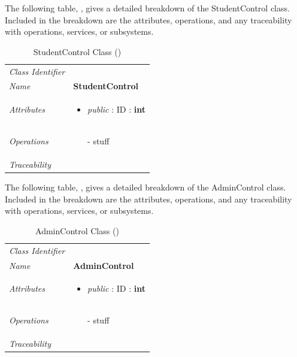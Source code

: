 \documentclass[12pt,letterpaper]{article}
\begin{document}
The following table, , gives a detailed breakdown of the StudentControl class. Included in the breakdown are the attributes, operations, and any traceability with operations, services, or subsystems.

\begin{table}[H]
    \caption{StudentControl Class ()} 
	\begin{tabu} to 
		\toprule
		Class Identifier &  \\
		Name & {\bf StudentControl} \\
		Attributes & 
		\begin{minipage}[t]{\linewidth}
		    \begin{itemize}
		        \item \textit{public} : ID : \bf{int}
			\end{itemize}
	    \end{minipage} \\

		Operations &
		\begin{minipage}[t]{\linewidth}
			\begin{enumerate}
			    \item[-] stuff
	        \end{enumerate}
	    \end{minipage} \\
	    	Traceability & \\
		\toprule
	\end{tabu}
\end{table}

The following table, , gives a detailed breakdown of the AdminControl class. Included in the breakdown are the attributes, operations, and any traceability with operations, services, or subsystems.

\begin{table}[H]
    \caption{AdminControl Class ()} 
	\begin{tabu} to 
		\toprule
		Class Identifier &  \\
		Name & {\bf AdminControl} \\
		Attributes & 
		\begin{minipage}[t]{\linewidth}
		    \begin{itemize}
		        \item \textit{public} : ID : \bf{int}
			\end{itemize}
	    \end{minipage} \\

		Operations &
		\begin{minipage}[t]{\linewidth}
			\begin{enumerate}
			    \item[-] stuff
	        \end{enumerate}
	    \end{minipage} \\
	    	Traceability & \\
		\toprule
	\end{tabu}
\end{table}
\end{document}
